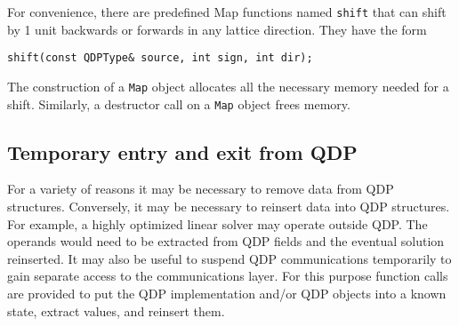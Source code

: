 \documentclass[12pt,letterpaper]{article}
\newcommand{\allNumericTypes}{All numeric types}
\newcommand{\itt}{\it Type}
\begin{document}
For convenience, there are predefined Map functions named \verb|shift|
that can shift by 1 unit backwards or forwards in any lattice direction.
They have the form
%
\begin{verbatim}
shift(const QDPType& source, int sign, int dir);
\end{verbatim}

The construction of a \verb|Map| object allocates all the necessary
memory needed for a shift. Similarly, a destructor call on a \verb|Map|
object frees memory.

\subsection{Temporary entry and exit from QDP}

For a variety of reasons it may be necessary to remove data from QDP
structures.  Conversely, it may be necessary to reinsert data into QDP
structures.  For example, a highly optimized linear solver may
operate outside QDP.  The operands would need to be extracted from QDP
fields and the eventual solution reinserted.  It may also be useful to
suspend QDP communications temporarily to gain separate access to the
communications layer.  For this purpose function calls are provided to
put the QDP implementation and/or QDP objects into a known state,
extract values, and reinsert them.

\end{document}
